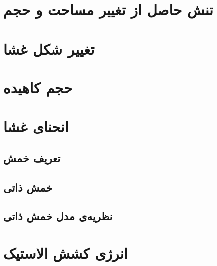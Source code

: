 \setRL
\clearpage

\def \MemTB {\Mempath /MembraneTheoreticalBackground}


%
\section{
تنش حاصل از تغییر مساحت و حجم
}

\section{
تغییر شکل غشا
}

\section{
حجم کاهیده
}



\section{
انحنای غشا
}
\subsection{
تعریف خمش
}


\subsection{
خمش ذاتی
}


\subsection{
نظریه‌ی مدل خمش ذاتی
\label{sec:spontaneousCurvatureModel}
}



\section{
انرژی کشش الاستیک
}











